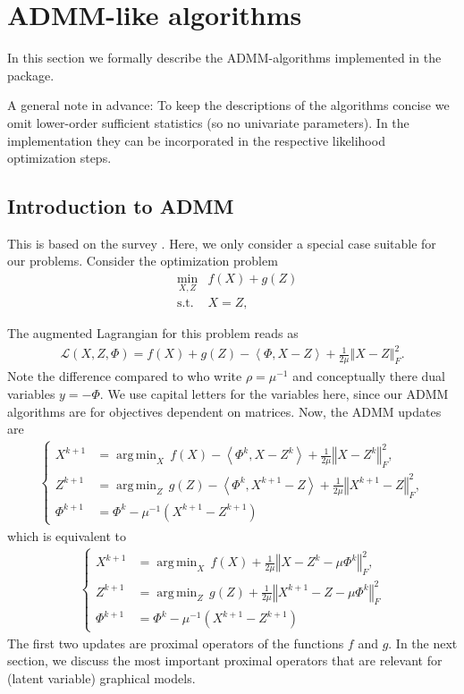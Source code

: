 \documentclass{article}
\newcommand{\bNorm}[1]{\left\Vert #1\right\Vert} %
\newcommand{\scalp}[1]{ \left\langle #1\right\rangle} %
\DeclareMathOperator{\argmin}{arg\,min}
\begin{document}
\section{ADMM-like algorithms}
\label{sec_admm}
In this section we formally describe the ADMM-algorithms implemented in the package.

A general note in advance: To keep the descriptions of the algorithms concise we omit lower-order sufficient statistics (so no univariate parameters). In the implementation they can be incorporated in the respective likelihood optimization steps.

% 
\subsection{Introduction to ADMM}
This is based on the survey \cite{boyd2011distributed}. Here, we only consider a special case suitable for our problems.
Consider the optimization problem
\begin{equation}
\begin{array}{lrlr}
&\underset{X, Z} {\min}&f(X) + g(Z)  \\
&\textrm{s.t.} & X=Z,
\end{array}
\end{equation}

The augmented Lagrangian for this problem reads as
\begin{align}
 \mathcal{L}(X, Z, \Phi) = f(X) + g(Z) - \scalp{\Phi, X - Z} + \frac{1}{2\mu}\bNorm{X - Z}_F^2.
\end{align}
Note the difference compared to \cite{boyd2011distributed} who write $\rho = \mu^{-1}$ and conceptually there dual variables $y = -\Phi$.
We use capital letters for the variables here, since our ADMM algorithms are for objectives dependent on matrices.
Now, the ADMM updates are
\begin{align*}
	\begin{cases}X^{k+1} &= \argmin_X \, f(X) - \scalp{\Phi^k, X-Z^k} + \frac{1}{2\mu}\bNorm{X - Z^k}_F^2, \\
		Z^{k+1} &= \argmin_Z \, g(Z) - \scalp{\Phi^k, X^{k+1} - Z} + \frac{1}{2\mu}\bNorm{X^{k+1} - Z}_F^2, \\
		\Phi^{k+1} &= \Phi^k - \mu^{-1}(X^{k+1} - Z^{k+1})\end{cases}
\end{align*}
which is equivalent to
\begin{align}
	\begin{cases}X^{k+1} &= \argmin_X \, f(X)  + \frac{1}{2\mu}\bNorm{X - Z^k - \mu\Phi^k}_F^2, \\
		Z^{k+1} &= \argmin_Z \, g(Z) + \frac{1}{2\mu}\bNorm{X^{k+1} - Z - \mu\Phi^k}_F^2 \\
		\Phi^{k+1} &= \Phi^k - \mu^{-1}(X^{k+1} - Z^{k+1})\end{cases} 
\end{align}
The first two updates are proximal operators of the functions $f$ and $g$. In the next section, we discuss the most important proximal operators that are relevant for (latent variable) graphical models.
\end{document}

